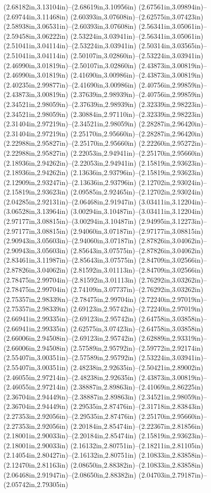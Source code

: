 (2.68182in,3.13104in)--(2.68619in,3.10956in) (2.67561in,3.09894in)--(2.69744in,3.11468in) (2.60393in,3.07608in)--(2.62575in,3.07423in) (2.58938in,3.06531in)--(2.60393in,3.07608in) (2.56341in,3.05061in)--(2.59458in,3.06222in) (2.53224in,3.03941in)--(2.56341in,3.05061in) (2.51041in,3.04114in)--(2.53224in,3.03941in) (2.50314in,3.03565in)--(2.51041in,3.04114in) (2.50107in,3.02860in)--(2.53224in,3.03941in) (2.46990in,3.01819in)--(2.50107in,3.02860in) (2.43873in,3.00819in)--(2.46990in,3.01819in) (2.41690in,3.00986in)--(2.43873in,3.00819in) (2.40235in,2.99877in)--(2.41690in,3.00986in) (2.40756in,2.99859in)--(2.43873in,3.00819in) (2.37639in,2.98939in)--(2.40756in,2.99859in) (2.34521in,2.98059in)--(2.37639in,2.98939in) (2.32339in,2.98223in)--(2.34521in,2.98059in) (2.30884in,2.97110in)--(2.32339in,2.98223in) (2.31404in,2.97219in)--(2.34521in,2.98059in) (2.28287in,2.96420in)--(2.31404in,2.97219in) (2.25170in,2.95660in)--(2.28287in,2.96420in) (2.22988in,2.95827in)--(2.25170in,2.95660in) (2.22260in,2.95272in)--(2.22988in,2.95827in) (2.22053in,2.94941in)--(2.25170in,2.95660in) (2.18936in,2.94262in)--(2.22053in,2.94941in) (2.15819in,2.93623in)--(2.18936in,2.94262in) (2.13636in,2.93796in)--(2.15819in,2.93623in) (2.12909in,2.93247in)--(2.13636in,2.93796in) (2.12702in,2.93024in)--(2.15819in,2.93623in) (2.09585in,2.92465in)--(2.12702in,2.93024in) (2.04285in,2.92131in)--(2.06468in,2.91947in) (3.03411in,3.12204in)--(3.06528in,3.13964in) (3.00294in,3.10487in)--(3.03411in,3.12204in) (2.97177in,3.08815in)--(3.00294in,3.10487in) (2.94995in,3.12273in)--(2.97177in,3.08815in) (2.94060in,3.07187in)--(2.97177in,3.08815in) (2.90943in,3.05603in)--(2.94060in,3.07187in) (2.87826in,3.04062in)--(2.90943in,3.05603in) (2.85643in,3.07575in)--(2.87826in,3.04062in) (2.83461in,3.11987in)--(2.85643in,3.07575in) (2.84709in,3.02566in)--(2.87826in,3.04062in) (2.81592in,3.01113in)--(2.84709in,3.02566in) (2.78475in,2.99704in)--(2.81592in,3.01113in) (2.76292in,3.03262in)--(2.78475in,2.99704in) (2.74109in,3.07737in)--(2.76292in,3.03262in) (2.75357in,2.98339in)--(2.78475in,2.99704in) (2.72240in,2.97019in)--(2.75357in,2.98339in) (2.69123in,2.95742in)--(2.72240in,2.97019in) (2.66941in,2.99335in)--(2.69123in,2.95742in) (2.64758in,3.03858in)--(2.66941in,2.99335in) (2.62575in,3.07423in)--(2.64758in,3.03858in) (2.66006in,2.94508in)--(2.69123in,2.95742in) (2.62889in,2.93319in)--(2.66006in,2.94508in) (2.57589in,2.95792in)--(2.59772in,2.92174in) (2.55407in,3.00351in)--(2.57589in,2.95792in) (2.53224in,3.03941in)--(2.55407in,3.00351in) (2.48238in,2.92635in)--(2.50421in,2.89002in) (2.46055in,2.97214in)--(2.48238in,2.92635in) (2.43873in,3.00819in)--(2.46055in,2.97214in) (2.38887in,2.89863in)--(2.41069in,2.86225in) (2.36704in,2.94449in)--(2.38887in,2.89863in) (2.34521in,2.98059in)--(2.36704in,2.94449in) (2.29535in,2.87476in)--(2.31718in,2.83843in) (2.27353in,2.92056in)--(2.29535in,2.87476in) (2.25170in,2.95660in)--(2.27353in,2.92056in) (2.20184in,2.85474in)--(2.22367in,2.81856in) (2.18001in,2.90033in)--(2.20184in,2.85474in) (2.15819in,2.93623in)--(2.18001in,2.90033in) (2.16132in,2.80751in)--(2.18211in,2.81105in) (2.14054in,2.80427in)--(2.16132in,2.80751in) (2.10833in,2.83858in)--(2.12470in,2.81163in) (2.08650in,2.88382in)--(2.10833in,2.83858in) (2.06468in,2.91947in)--(2.08650in,2.88382in) (2.04703in,2.79187in)--(2.05742in,2.79305in) 